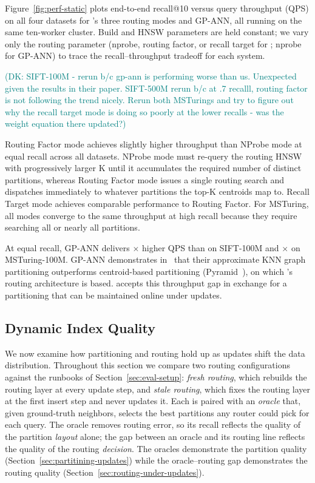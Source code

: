 \documentclass[sigconf,review,anonymous]{acmart}
\newcommand{\dk}[1]{\textcolor{teal}{(DK: #1)}}
\begin{document}
Figure~\ref{fig:perf-static} plots end-to-end recall@10 versus query throughput (QPS) on all four datasets for \SystemName{}'s three routing modes and GP-ANN, all running on the same ten-worker cluster. Build and HNSW parameters are held constant; we vary only the routing parameter (nprobe, routing factor, or recall target for \SystemName{}; nprobe for GP-ANN) to trace the recall–throughput tradeoff for each system.

\dk{SIFT-100M - rerun b/c gp-ann is performing worse than us. Unexpected given the results in their paper. SIFT-500M rerun b/c at .7 recalll, routing factor is not following the trend nicely. Rerun both MSTurings and try to figure out why the recall target mode is doing so poorly at the lower recalls - was the weight equation there updated?}

Routing Factor mode achieves slightly higher throughput than NProbe mode at equal recall across all datasets. NProbe mode must re-query the routing HNSW with progressively larger K until it accumulates the required number of distinct partitions, whereas Routing Factor mode issues a single routing search and dispatches immediately to whatever partitions the top-K centroids map to. Recall Target mode achieves comparable performance to Routing Factor. For MSTuring, all modes converge to the same throughput at high recall because they require searching all or nearly all partitions.

At equal recall, GP-ANN delivers $\times$ higher QPS than \SystemName{} on SIFT-100M and $\times$ on MSTuring-100M. GP-ANN demonstrates in~\cite{gottesbueren2025unleashing} that their approximate KNN graph partitioning outperforms centroid-based partitioning (Pyramid~\cite{deng2019pyramid}), on which \SystemName{}'s routing architecture is based. \SystemName{} accepts this throughput gap in exchange for a partitioning that can be maintained online under updates.

\subsection{Dynamic Index Quality}
\label{sec:eval-routing}

We now examine how partitioning and routing hold up as updates shift the data distribution. Throughout this section we compare two routing configurations against the runbooks of Section~\ref{sec:eval-setup}: \emph{fresh routing}, which rebuilds the routing layer at every update step, and \emph{stale routing}, which fixes the routing layer at the first insert step and never updates it. Each is paired with an \emph{oracle} that, given ground-truth neighbors, selects the best partitions any router could pick for each query. The oracle removes routing error, so its recall reflects the quality of the partition \emph{layout} alone; the gap between an oracle and its routing line reflects the quality of the routing \emph{decision}. The oracles demonstrate the partition quality (Section~\ref{sec:partitining-updates}) while the oracle--routing gap demonstrates the routing quality (Section~\ref{sec:routing-under-updates}). 
\end{document}
